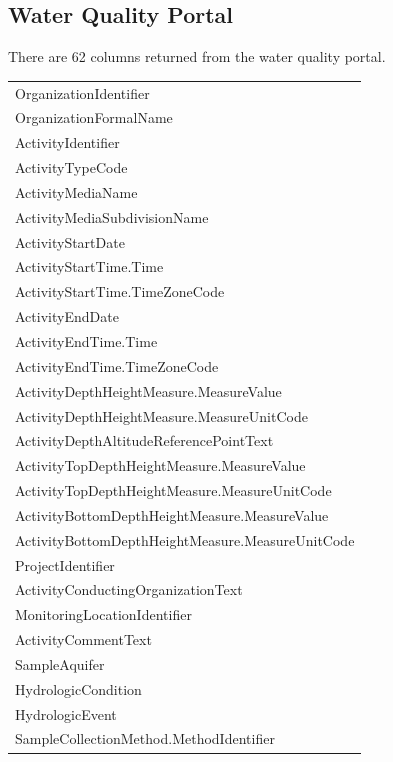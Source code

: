 \documentclass[a4paper,11pt]{article}
\begin{document}
\subsection{Water Quality Portal}
\label{sec:appendix2WQP}
There are 62 columns returned from the water quality portal. 

\begin{tabular}{l}
  \hline
  \hline
OrganizationIdentifier \\ 
  OrganizationFormalName \\ 
  ActivityIdentifier \\ 
  ActivityTypeCode \\ 
  ActivityMediaName \\ 
  ActivityMediaSubdivisionName \\ 
  ActivityStartDate \\ 
  ActivityStartTime.Time \\ 
  ActivityStartTime.TimeZoneCode \\ 
  ActivityEndDate \\ 
  ActivityEndTime.Time \\ 
  ActivityEndTime.TimeZoneCode \\ 
  ActivityDepthHeightMeasure.MeasureValue \\ 
  ActivityDepthHeightMeasure.MeasureUnitCode \\ 
  ActivityDepthAltitudeReferencePointText \\ 
  ActivityTopDepthHeightMeasure.MeasureValue \\ 
  ActivityTopDepthHeightMeasure.MeasureUnitCode \\ 
  ActivityBottomDepthHeightMeasure.MeasureValue \\ 
  ActivityBottomDepthHeightMeasure.MeasureUnitCode \\ 
  ProjectIdentifier \\ 
  ActivityConductingOrganizationText \\ 
  MonitoringLocationIdentifier \\ 
  ActivityCommentText \\ 
  SampleAquifer \\ 
  HydrologicCondition \\ 
  HydrologicEvent \\ 
  SampleCollectionMethod.MethodIdentifier \\ 

\end{tabular}
\end{document}
